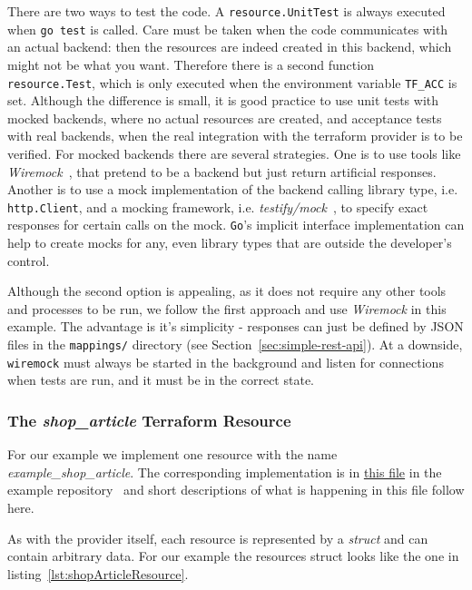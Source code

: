 \documentclass[paper=a4,11pt,numbers=noenddot]{article}
\begin{document}
There are two ways to test the code. A \verb'resource.UnitTest' is always executed when \verb'go test' is called. Care must be taken when the code communicates with an actual backend: then the resources are indeed created in this backend, which might not be what you want. Therefore there is a second function \verb'resource.Test', which is only executed when the environment variable \verb'TF_ACC' is set. Although the difference is small, it is good practice to use unit tests with mocked backends, where no actual resources are created, and acceptance tests with real backends, when the real integration with the terraform provider is to be verified. For mocked backends there are several strategies. One is to use tools like \emph{Wiremock}~\cite{noauthor_wiremock_nodate}, that pretend to be a backend but just return artificial responses. Another is to use a mock implementation of the backend calling library type, i.e. \verb'http.Client', and a mocking framework, i.e. \emph{testify/mock}~\cite{noauthor_testifymock_nodate}, to specify exact responses for certain calls on the mock. \verb'Go''s implicit interface implementation can help to create mocks for any, even library types that are outside the developer's control.

Although the second option is appealing, as it does not require any other tools and processes to be run, we follow the first approach and use \emph{Wiremock} in this example. The advantage is it's simplicity - responses can just be defined by JSON files in the \verb'mappings/' directory (see Section~\ref{sec:simple-rest-api}). At a downside, \verb'wiremock' must always be started in the background and listen for connections when tests are run, and it must be in the correct state.

\subsubsection{The \emph{shop\_article} Terraform Resource}
\label{subsec:emphsh-reso}

For our example we implement one resource with the name \emph{example\_shop\_article}. The corresponding implementation is in \href{https://github.com/ecky-l/terraform-provider-example/blob/main/src/tfp-example/example/shop_article_resource.go}{this file} in the example repository~\cite{ecky-l_terraform-provider-example_nodate} and short descriptions of what is happening in this file follow here.

As with the provider itself, each resource is represented by a \emph{struct} and can contain arbitrary data. For our example the resources struct looks like the one in listing~\ref{lst:shopArticleResource}.
\end{document}

